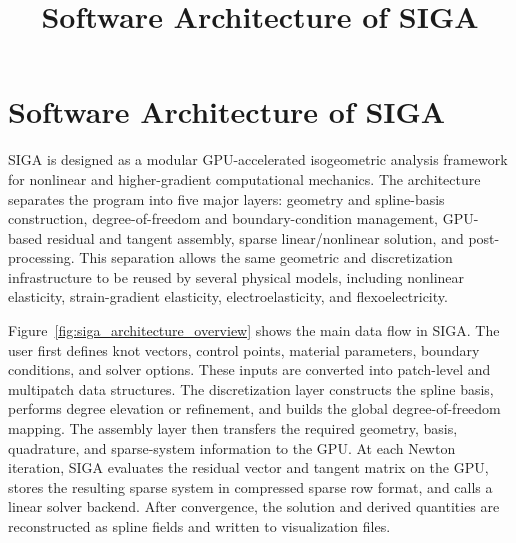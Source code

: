 \documentclass[11pt]{article}
\title{Software Architecture of SIGA}
\author{}
\date{}
\begin{document}
\maketitle

\section{Software Architecture of SIGA}
\label{sec:software_architecture}

SIGA is designed as a modular GPU-accelerated isogeometric analysis framework for nonlinear and higher-gradient computational mechanics. The architecture separates the program into five major layers: geometry and spline-basis construction, degree-of-freedom and boundary-condition management, GPU-based residual and tangent assembly, sparse linear/nonlinear solution, and post-processing. This separation allows the same geometric and discretization infrastructure to be reused by several physical models, including nonlinear elasticity, strain-gradient elasticity, electroelasticity, and flexoelectricity.

Figure~\ref{fig:siga_architecture_overview} shows the main data flow in SIGA. The user first defines knot vectors, control points, material parameters, boundary conditions, and solver options. These inputs are converted into patch-level and multipatch data structures. The discretization layer constructs the spline basis, performs degree elevation or refinement, and builds the global degree-of-freedom mapping. The assembly layer then transfers the required geometry, basis, quadrature, and sparse-system information to the GPU. At each Newton iteration, SIGA evaluates the residual vector and tangent matrix on the GPU, stores the resulting sparse system in compressed sparse row format, and calls a linear solver backend. After convergence, the solution and derived quantities are reconstructed as spline fields and written to visualization files.
\end{document}
